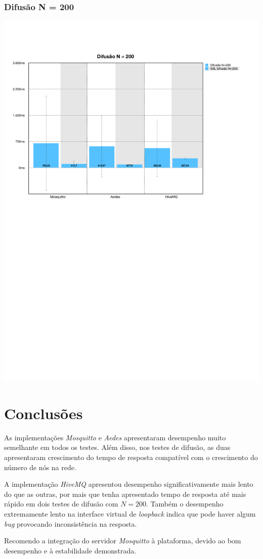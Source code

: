 \documentclass[12pt,a4paper]{article}
\begin{document}
\subsubsection{Difusão N = 200}
\begin{center}
\includegraphics[width=1.0\textwidth]{eth_spread2.pdf}
\end{center}

\section{Conclusões}

As implementações \textit{Mosquitto} e \textit{Aedes} apresentaram desempenho muito semelhante em todos os testes. Além disso, nos testes de difusão, as duas apresentaram crescimento do tempo de resposta compatível com o crescimento do número de nós na rede. 

A implementação \textit{HiveMQ} apresentou desempenho significativamente mais lento do que as outras, por mais que tenha apresentado tempo de resposta até mais rápido em dois testes de difusão com $N = 200$. Também o desempenho extremamente lento na interface virtual de \textit{loopback} indica que pode haver algum \textit{bug} provocando inconsistência na resposta.

Recomendo a integração do servidor \textit{Mosquitto} à plataforma, devido ao bom desempenho e à estabilidade demonstrada.
    
\end{document}

